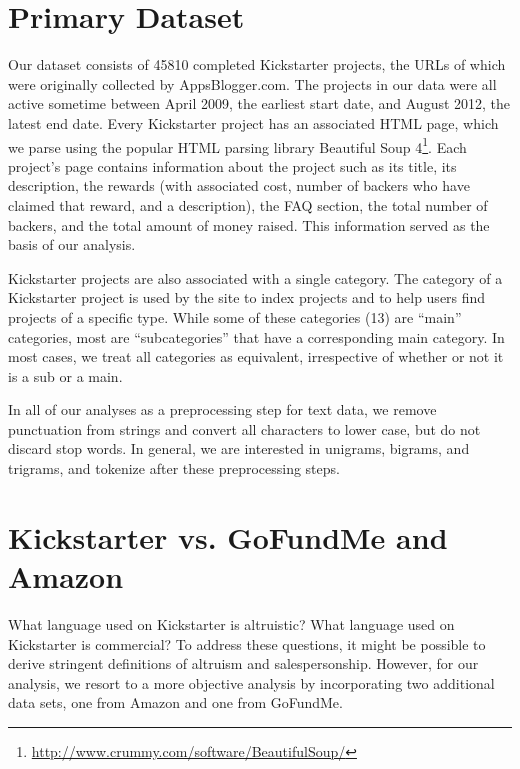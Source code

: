 \documentclass[letterpaper]{article}
\begin{document}
\section{Primary Dataset}
Our dataset consists of 45810 completed Kickstarter projects, the URLs of which were originally collected by AppsBlogger.com. The projects in our data were all active sometime between April 2009, the earliest start date, and August 2012, the latest end date. Every Kickstarter project has an associated HTML page, which we parse using the popular HTML parsing library Beautiful Soup 4\footnote{\url{http://www.crummy.com/software/BeautifulSoup/}}. Each project's page contains information about the project such as its title, its description, the rewards (with associated cost, number of backers who have claimed that reward, and a description), the FAQ section, the total number of backers, and the total amount of money raised. This information served as the basis of our analysis.

Kickstarter projects are also associated with a single category. The category of a Kickstarter project is used by the site to index projects and to help users find projects of a specific type. While some of these categories (13) are ``main'' categories, most are ``subcategories'' that have a corresponding main category. In most cases, we treat all categories as equivalent, irrespective of whether or not it is a sub or a main.

In all of our analyses as a preprocessing step for text data, we remove punctuation from strings and convert all characters to lower case, but do not discard stop words. In general, we are interested in unigrams, bigrams, and trigrams, and tokenize after these preprocessing steps.

\section{Kickstarter vs. GoFundMe and Amazon}
What language used on Kickstarter is altruistic? What language used on Kickstarter is commercial? To address these questions, it might be possible to derive stringent definitions of altruism and salespersonship. However, for our analysis, we resort to a more objective analysis by incorporating two additional data sets, one from Amazon and one from GoFundMe.
\end{document}
